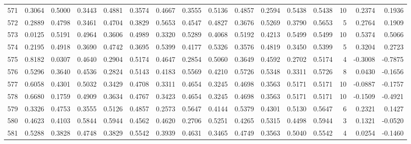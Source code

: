 \begin{tabular}{lrrrrrrrrrrrrrrr}
571 &      0.3064 &  0.5000 &  0.3443 &  0.4881 &  0.3574 &  0.4667 &  0.3555 &  0.5136 &  0.4857 &  0.2594 &   0.5438 &     0.5438 &     10 &                    0.2374 &                     0.1936 \\
572 &      0.2889 &  0.4798 &  0.3461 &  0.4704 &  0.3829 &  0.5653 &  0.4547 &  0.4827 &  0.3676 &  0.5269 &   0.3790 &     0.5653 &      5 &                    0.2764 &                     0.1909 \\
573 &      0.0125 &  0.5191 &  0.4964 &  0.3606 &  0.4989 &  0.3320 &  0.5289 &  0.4068 &  0.5192 &  0.4213 &   0.5499 &     0.5499 &     10 &                    0.5374 &                     0.5066 \\
574 &      0.2195 &  0.4918 &  0.3690 &  0.4742 &  0.3695 &  0.5399 &  0.4177 &  0.5326 &  0.3576 &  0.4819 &   0.3450 &     0.5399 &      5 &                    0.3204 &                     0.2723 \\
575 &      0.8182 &  0.0307 &  0.4640 &  0.2904 &  0.5174 &  0.4647 &  0.2854 &  0.5060 &  0.3649 &  0.4592 &   0.2702 &     0.5174 &      4 &                   -0.3008 &                    -0.7875 \\
576 &      0.5296 &  0.3640 &  0.4536 &  0.2824 &  0.5143 &  0.4183 &  0.5569 &  0.4210 &  0.5726 &  0.5348 &   0.3311 &     0.5726 &      8 &                    0.0430 &                    -0.1656 \\
577 &      0.6058 &  0.4301 &  0.5032 &  0.3429 &  0.4708 &  0.3311 &  0.4654 &  0.3245 &  0.4698 &  0.3563 &   0.5171 &     0.5171 &     10 &                   -0.0887 &                    -0.1757 \\
578 &      0.6680 &  0.1759 &  0.4909 &  0.3634 &  0.4767 &  0.3423 &  0.4654 &  0.3245 &  0.4698 &  0.3563 &   0.5171 &     0.5171 &     10 &                   -0.1509 &                    -0.4921 \\
579 &      0.3326 &  0.4753 &  0.3555 &  0.5126 &  0.4857 &  0.2573 &  0.5647 &  0.4144 &  0.5379 &  0.4301 &   0.5130 &     0.5647 &      6 &                    0.2321 &                     0.1427 \\
580 &      0.4623 &  0.4103 &  0.5844 &  0.5944 &  0.4562 &  0.4620 &  0.2706 &  0.5251 &  0.4265 &  0.5315 &   0.4498 &     0.5944 &      3 &                    0.1321 &                    -0.0520 \\
581 &      0.5288 &  0.3828 &  0.4748 &  0.3829 &  0.5542 &  0.3939 &  0.4631 &  0.3465 &  0.4749 &  0.3563 &   0.5040 &     0.5542 &      4 &                    0.0254 &                    -0.1460 \\

\end{tabular}
